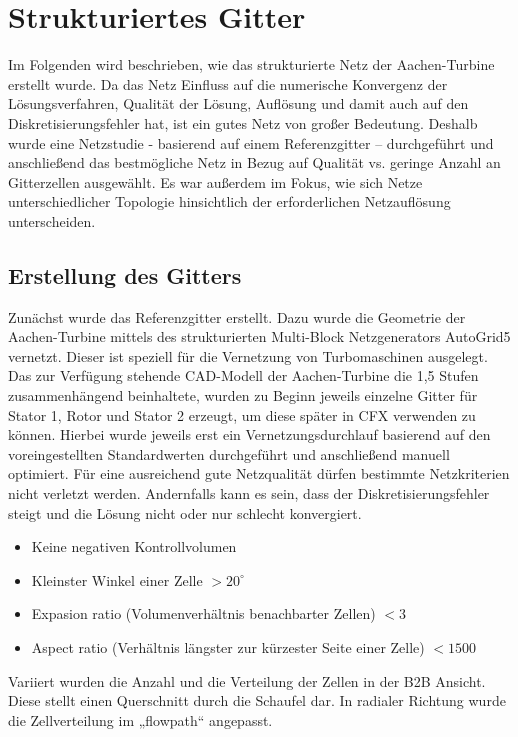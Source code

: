 \section{Strukturiertes Gitter}
Im Folgenden wird beschrieben, wie das strukturierte Netz der Aachen-Turbine erstellt wurde. Da das Netz Einfluss auf die numerische Konvergenz der Lösungsverfahren, Qualität der Lösung, Auflösung und damit auch auf den Diskretisierungsfehler hat, ist ein gutes Netz von großer Bedeutung. Deshalb wurde eine Netzstudie - basierend auf einem Referenzgitter – durchgeführt und anschließend das bestmögliche Netz in Bezug auf Qualität vs. geringe Anzahl an Gitterzellen ausgewählt. Es war außerdem im Fokus, wie sich Netze unterschiedlicher Topologie hinsichtlich der erforderlichen Netzauflösung unterscheiden.

\subsection{Erstellung des Gitters}

Zunächst wurde das Referenzgitter erstellt. Dazu wurde die Geometrie der Aachen-Turbine mittels des strukturierten Multi-Block Netzgenerators AutoGrid5 vernetzt. Dieser ist speziell für die Vernetzung von Turbomaschinen ausgelegt. 
Das zur Verfügung stehende CAD-Modell der Aachen-Turbine die 1,5 Stufen zusammenhängend beinhaltete, wurden zu Beginn jeweils einzelne Gitter für Stator 1, Rotor und Stator 2 erzeugt, um diese später in CFX verwenden zu können. Hierbei wurde jeweils erst ein Vernetzungsdurchlauf basierend auf den voreingestellten Standardwerten durchgeführt und anschließend manuell optimiert. Für eine ausreichend gute Netzqualität dürfen bestimmte Netzkriterien nicht verletzt werden. Andernfalls kann es sein, dass der Diskretisierungsfehler steigt und die Lösung nicht oder nur schlecht konvergiert.
\begin{itemize}
	\item Keine negativen Kontrollvolumen
	\item Kleinster Winkel einer Zelle $> 20^\circ$
	\item Expasion ratio (Volumenverhältnis benachbarter Zellen) $< 3$
	\item Aspect ratio (Verhältnis längster zur kürzester Seite einer Zelle) $< 1500$ 
\end{itemize}
Variiert wurden die Anzahl und die Verteilung der Zellen in der B2B Ansicht. Diese stellt einen Querschnitt durch die Schaufel dar. In radialer Richtung wurde die Zellverteilung im „flowpath“ angepasst. 

